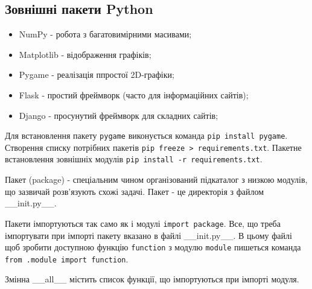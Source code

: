 \subsection{Зовнішні пакети Python} 
\begin{frame}
\begin{itemize}
  \item NumPy - робота з багатовимірними масивами;
  \item Matplotlib - відображення графіків;
  \item Pygame - реалізація ппростої 2D-графіки;
  \item Flask - простий фреймворк (часто для інформаційних сайтів);
  \item Django - просунутий фреймворк для складних сайтів;
\end{itemize}

Для встановлення пакету \texttt{pygame} виконується команда \texttt{pip install pygame}. Створення списку потрібних пакетів \texttt{pip freeze > requirements.txt}. Пакетне встановлення зовнішніх модулів \texttt{pip install -r requirements.txt}. 
\end{frame}

\begin{frame}
Пакет (package) - спеціальним чином організований підкаталог з низкою модулів, що зазвичай розв'язують схожі задачі. Пакет - це директорія з файлом \_\_init.py\_\_.

Пакети імпортуються так само як і модулі \texttt{import package}. Все, що треба імпортувати при імпорті пакету вказано в файлі \_\_init.py\_\_. В цьому файлі щоб зробити доступною функцію \texttt{function} з модулю \texttt{module}  пишеться команда \texttt{from .module import function}.

Змінна \_\_all\_\_ містить список функції, що імпортуються при імпорті модуля.
\end{frame}
